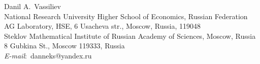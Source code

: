\documentclass{amsart}
\begin{document}
	\vspace{5mm}
	
	\noindent
	Danil A.~Vassiliev\\
	National Research University Higher School of Economics, Russian Federation\\
	AG Laboratory, HSE, 6 Usacheva str., Moscow, Russia, 119048\\
	Steklov Mathematical Institute of Russian Academy of Sciences, Moscow, Russia\\
	8 Gubkina St., Moscow 119333, Russia\\
	\textit{E-mail}:{\ danneks@yandex.ru}
	
	
\end{document}
